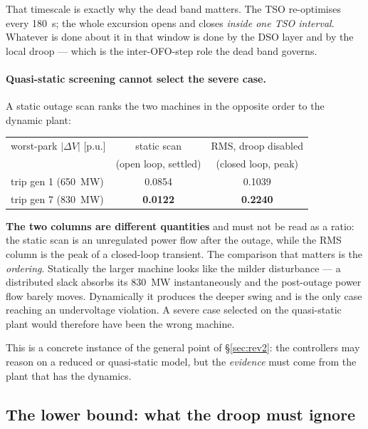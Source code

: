 \documentclass[11pt,a4paper]{article}
\newcommand{\pu}{\ensuremath{\mathrm{p.u.}}}
\begin{document}
That timescale is exactly why the dead band matters. The TSO re-optimises every
\SI{180}{\second}; the whole excursion opens and closes \emph{inside one TSO
interval}. Whatever is done about it in that window is done by the DSO layer and
by the local droop --- which is the inter-OFO-step role the dead band governs.

\paragraph{Quasi-static screening cannot select the severe case.} A static
outage scan ranks the two machines in the opposite order to the dynamic plant:

\begin{center}
\begin{tabular}{lcc}
\toprule
worst-park $|\Delta V|$ [\pu]
  & static scan & RMS, droop disabled \\
  & (open loop, settled) & (closed loop, peak) \\
\midrule
trip gen 1 (\SI{650}{\mega\watt}) & 0.0854 & 0.1039 \\
trip gen 7 (\SI{830}{\mega\watt}) & \textbf{0.0122} & \textbf{0.2240} \\
\bottomrule
\end{tabular}
\end{center}

\noindent \textbf{The two columns are different quantities} and must not be read
as a ratio: the static scan is an unregulated power flow after the outage, while
the RMS column is the peak of a closed-loop transient. The comparison that
matters is the \emph{ordering}. Statically the larger machine looks like the
milder disturbance --- a distributed slack absorbs its \SI{830}{\mega\watt}
instantaneously and the post-outage power flow barely moves. Dynamically it
produces the deeper swing and is the only case reaching an undervoltage
violation. A severe case selected on the quasi-static plant would therefore have
been the wrong machine.

This is a concrete instance of the general point of \S\ref{sec:rev2}: the
controllers may reason on a reduced or quasi-static model, but the
\emph{evidence} must come from the plant that has the dynamics.

\subsection{The lower bound: what the droop must ignore}
\end{document}
